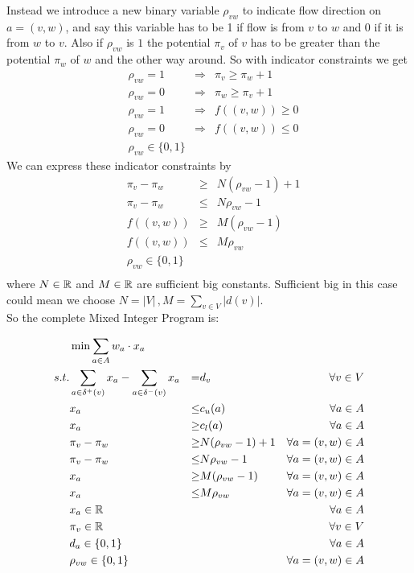 Instead we introduce a new binary variable $\rho_{vw}$ to indicate flow direction on $a=(v,w)$, and say this variable 
has to be 1 if flow is from $v$ to $w$ and 0 if it is from $w$ to $v$. Also if $\rho_{vw}$ is $1$ the potential 
$\pi_v$ of $v$ has to be greater than the potential $\pi_w$ of $w$ and the other way around. So with indicator 
constraints we get
\begin{align*}
 &\rho_{vw}=1 &\Rightarrow &\pi_v\ge\pi_w +1\\
 &\rho_{vw}=0 &\Rightarrow &\pi_w\ge\pi_v +1\\
 &\rho_{vw}=1 &\Rightarrow &f((v,w))\ge 0\\
 &\rho_{vw}=0 &\Rightarrow &f((v,w))\le 0\\
 &\rho_{vw} \in \{0,1\}&&
\end{align*}
We can express these indicator constraints by
\begin{align*}
 &\pi_v-\pi_w &\ge & N(\rho_{vw}-1)+1\\
 &\pi_v-\pi_w&\le &N\rho_{vw}-1 \\
 &f((v,w))&\ge& M(\rho_{vw}-1)\\
 &f((v,w))&\le & M\rho_{vw}\\
 &\rho_{vw} \in \{0,1\}&&\\
\end{align*}
where $N\in \mathbb{R}$ and $M\in \mathbb{R}$ are sufficient big constants. Sufficient big in this case could mean we choose 
$N=|V|\, ,M=\sum_{v\in V}|d(v)|$. \\
So the complete Mixed Integer Program is:

\begin{align*}
  &\min \sum_{a\in A} w_a\cdot x_a & \\
 s.t. & \sum_{a\in \delta^+(v)}x_a - \sum_{a\in\delta^- (v)}x_a &=& d_v\ &\forall v\in V \\
 & x_a &\le& c_u(a) & \forall a\in A\\
 & x_a &\ge& c_l(a) & \forall a\in A\\
 & \pi_v-\pi_w &\ge & N(\rho_{vw}-1)+1& \forall a=(v,w)\in A\\
 & \pi_v-\pi_w&\le &N\rho_{vw}-1& \forall a=(v,w)\in A\\
 & x_a&\ge& M(\rho_{vw}-1)& \forall a=(v,w)\in A\\
 & x_a&\le & M\rho_{vw}& \forall a=(v,w)\in A\\
 & x_a \in \mathbb{R} & & &\forall a\in A\\
 & \pi_v \in \mathbb{R} & & & \forall v\in V\\
 & d_a \in \{0,1\} & & &\forall a\in A\\
 & \rho_{vw} \in \{0,1\}&&& \forall a=(v,w)\in A\\
\end{align*}

